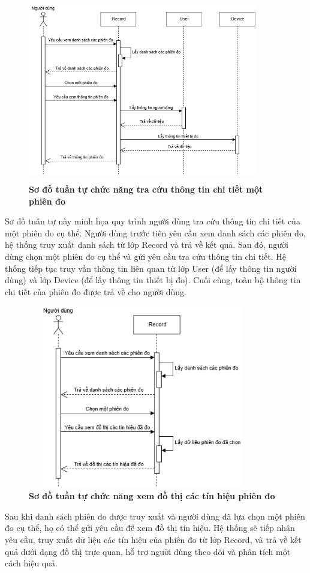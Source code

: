 \begin{figure}[H]
	\centering
	\includegraphics[width=10cm,height=8cm]{Images/sequence/record/getById.drawio.png}
	\caption[Sơ đồ tuần tự chức năng tra cứu thông tin chi tiết một phiên đo]{\bfseries \fontsize{12pt}{0pt}
		\selectfont Sơ đồ tuần tự chức năng tra cứu thông tin chi tiết một phiên đo}
	\label{sequence_get_record_by_id} %
\end{figure}
Sơ đồ tuần tự này minh họa quy trình người dùng tra cứu thông tin chi tiết của một phiên đo cụ thể. Người dùng trước tiên yêu cầu xem danh sách các phiên đo, hệ thống truy xuất danh sách từ lớp Record và trả về kết quả.
Sau đó, người dùng chọn một phiên đo cụ thể và gửi yêu cầu tra cứu thông tin chi tiết. Hệ thống tiếp tục truy vấn thông tin liên quan từ lớp User (để lấy thông tin người dùng) và lớp Device (để lấy thông tin thiết bị đo).
Cuối cùng, toàn bộ thông tin chi tiết của phiên đo được trả về cho người dùng.

\begin{figure}[H]
	\centering
	\includegraphics[width=10cm,height=8cm]{Images/sequence/record/chart.drawio.png}
	\caption[Sơ đồ tuần tự chức năng xem đồ thị các tín hiệu phiên đo]{\bfseries \fontsize{12pt}{0pt}
		\selectfont Sơ đồ tuần tự chức năng xem đồ thị các tín hiệu phiên đo}
	\label{sequence_chart} %
\end{figure}
Sau khi danh sách phiên đo được truy xuất và người dùng đã lựa chọn một phiên đo cụ thể, họ có thể gửi yêu cầu để xem đồ thị tín hiệu.
Hệ thống sẽ tiếp nhận yêu cầu, truy xuất dữ liệu các tín hiệu của phiên đo từ lớp Record, và trả về kết quả dưới dạng đồ thị trực quan, hỗ trợ người dùng theo dõi và phân tích một cách hiệu quả.

